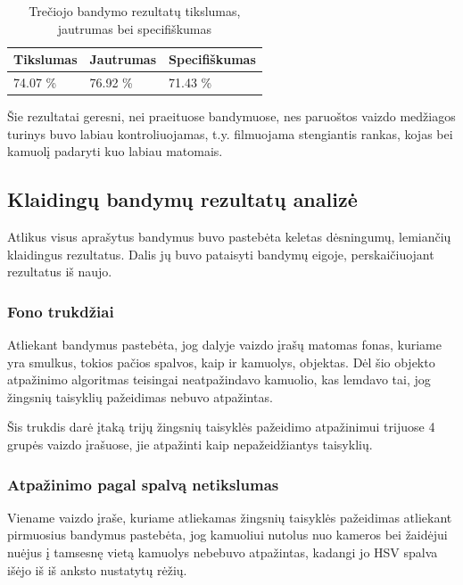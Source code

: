 \documentclass{VUMIFPSbakalaurinis}
\begin{document}
\begin{table}[H]\footnotesize
	\centering
	\caption{Trečiojo bandymo rezultatų tikslumas, jautrumas bei specifiškumas}
	{\begin{tabular}{|p{5cm}|p{5cm}|p{5cm}|} \hline
			\textbf{Tikslumas} & \textbf{Jautrumas} & \textbf{Specifiškumas} \\
			\hline
			74.07 \%  & 76.92 \%    & 71.43 \%    \\
			
			\hline
	\end{tabular}}
	\label{tab:fifth_trial_percents}
\end{table}

Šie rezultatai geresni, nei praeituose bandymuose, nes paruoštos vaizdo medžiagos turinys buvo labiau kontroliuojamas, t.y. filmuojama stengiantis rankas, kojas bei kamuolį padaryti kuo labiau matomais.

\subsection{Klaidingų bandymų rezultatų analizė}

Atlikus visus aprašytus bandymus buvo pastebėta keletas dėsningumų, lemiančių klaidingus rezultatus. Dalis jų buvo pataisyti bandymų eigoje, perskaičiuojant rezultatus iš naujo.

\subsubsection{Fono trukdžiai}

Atliekant bandymus pastebėta, jog dalyje vaizdo įrašų matomas fonas, kuriame yra smulkus, tokios pačios spalvos, kaip ir kamuolys, objektas. Dėl šio objekto atpažinimo algoritmas teisingai neatpažindavo kamuolio, kas lemdavo tai, jog žingsnių taisyklių pažeidimas nebuvo atpažintas. 

Šis trukdis darė įtaką trijų žingsnių taisyklės pažeidimo atpažinimui trijuose 4 grupės vaizdo įrašuose, jie atpažinti kaip nepažeidžiantys taisyklių. 

\subsubsection{Atpažinimo pagal spalvą netikslumas}

Viename vaizdo įraše, kuriame atliekamas žingsnių taisyklės pažeidimas atliekant pirmuosius bandymus pastebėta, jog kamuoliui nutolus nuo kameros bei žaidėjui nuėjus į tamsesnę vietą kamuolys nebebuvo atpažintas, kadangi jo HSV spalva išėjo iš iš anksto nustatytų rėžių.  
\end{document}
